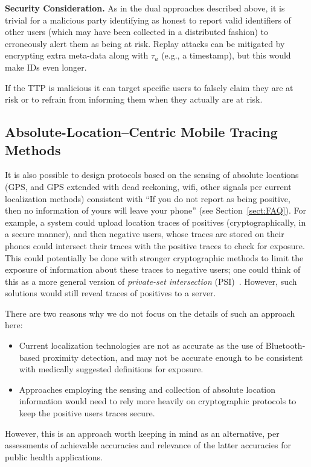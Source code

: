 \documentclass{article}
\begin{document}
{\bf Security Consideration.} As in the dual approaches described above, it is trivial for a malicious party identifying as honest to report valid identifiers of other users (which may have been collected in a distributed fashion) to erroneously alert them as being at risk. Replay attacks can be mitigated by encrypting extra meta-data along with $\tau_u$ (e.g., a timestamp), but this would make IDs even longer.

If the TTP is malicious it can target specific users to falsely claim they are at risk or to refrain from informing them when they actually are at risk.


\subsection{Absolute-Location--Centric Mobile Tracing Methods}\label{sect:GPS}
It is also possible to design protocols based on the sensing of absolute locations (GPS, and GPS extended with dead reckoning, wifi, other signals per current localization methods) consistent with ``If you do not report as being positive, then no information of yours will leave your phone'' (see Section~\ref{sect:FAQ}).  For example, a system could upload location traces of positives (cryptographically, in a secure manner), and then negative users, whose traces are stored on their phones could intersect their traces with the positive traces to check for exposure. This could potentially be done with stronger cryptographic methods to limit the exposure of information about these traces to negative users; one could think of this as a more general version of {\em private-set intersection} (PSI)~\cite{PSI,PSI2,PSI3}. However, such solutions would still reveal traces of positives to a server.  

There are two reasons why we do not focus on the details of such an approach here:
\begin{itemize}
    \item Current localization technologies are not as accurate as the use of Bluetooth-based proximity detection, and may not be accurate enough to be consistent with medically suggested definitions for exposure.
    \item Approaches employing the sensing and collection of absolute location information would need to rely more heavily on cryptographic protocols to keep the positive users traces secure.
\end{itemize}
However, this is an approach worth keeping in mind as an alternative, per assessments of achievable accuracies and relevance of the latter accuracies for public health applications.
\end{document}
